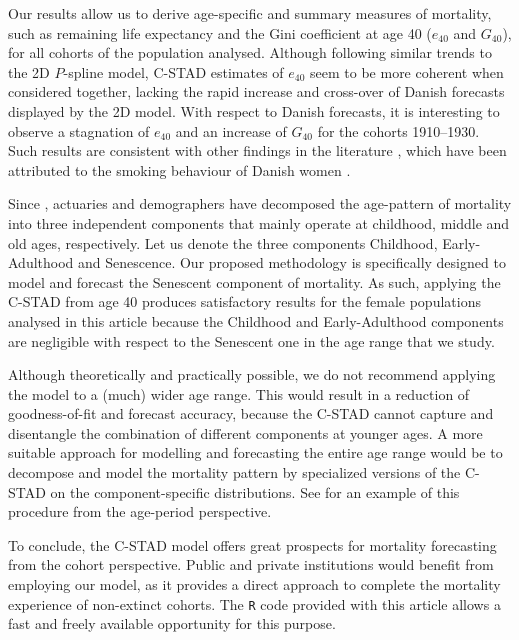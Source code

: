\documentclass[11pt, a4paper]{article}
\begin{document}
Our results allow us to derive age-specific and summary measures of mortality, such as remaining life expectancy and the Gini coefficient at age 40 ($e_{40}$ and $G_{40}$), for all cohorts of the population analysed. Although following similar trends to the 2D $P$-spline model, C-STAD estimates of $e_{40}$ seem to be more coherent when considered together, lacking the rapid increase and cross-over of Danish forecasts displayed by the 2D model. With respect to Danish forecasts, it is interesting to observe a stagnation of $e_{40}$ and an increase of $G_{40}$ for the cohorts 1910--1930. Such results are consistent with other findings in the literature \cite[see, e.g., Fig.~4 in][]{jacobsen2002long}, which have been attributed to the smoking behaviour of Danish women \citep{jacobsen2006causes,lindahl2016did}. 

Since \cite{thiele1871mathematical}, actuaries and demographers have decomposed the age-pattern of mortality into three independent components that mainly operate at childhood, middle and old ages, respectively. Let us denote the three components Childhood, Early-Adulthood and Senescence. Our proposed methodology is specifically designed to model and forecast the Senescent component of mortality. As such, applying the C-STAD from age 40 produces satisfactory results for the female populations analysed in this article because the Childhood and Early-Adulthood components are negligible with respect to the Senescent one in the age range that we study. 
	
Although theoretically and practically possible, we do not recommend applying the model to a (much) wider age range. This would result in a reduction of goodness-of-fit and forecast accuracy, because the C-STAD cannot capture and disentangle the combination of different components at younger ages. A more suitable approach for modelling and forecasting the entire age range would be to decompose and model the mortality pattern by specialized versions of the C-STAD on the component-specific distributions. See \cite{basellini2019three} for an example of this procedure from the age-period perspective.

To conclude, the C-STAD model offers great prospects for mortality forecasting from the cohort perspective. Public and private institutions would benefit from employing our model, as it provides a direct approach to complete the mortality experience  of non-extinct cohorts. The \texttt{R} code provided with this article allows a fast and freely available opportunity for this purpose. 
\end{document}
